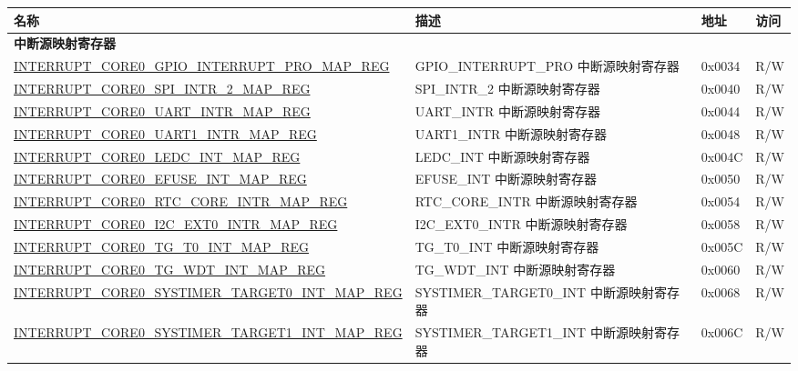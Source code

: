\begin{longtable}{ | p{10cm} | m{10cm} | m{1.3cm} | m{1.0cm} | }
\hline\rowcolor{lightgray}
名称 & 描述 & 地址 & 访问 \\ \hline
\endhead
\multicolumn{4}{|l|}{\textbf{中断源映射寄存器}} \\ \hline
\hyperref[regdesc:INTERRUPTCORE0GPIOINTERRUPTPROMAPREG]{INTERRUPT\_CORE0\_GPIO\_INTERRUPT\_PRO\_MAP\_REG} & GPIO\_INTERRUPT\_PRO 中断源映射寄存器 & 0x0034 & R/W \\ \hline
\hyperref[regdesc:INTERRUPTCORE0SPIINTR2MAPREG]{INTERRUPT\_CORE0\_SPI\_INTR\_2\_MAP\_REG} & SPI\_INTR\_2 中断源映射寄存器 & 0x0040 & R/W \\ \hline
\hyperref[regdesc:INTERRUPTCORE0UARTINTRMAPREG]{INTERRUPT\_CORE0\_UART\_INTR\_MAP\_REG} & UART\_INTR 中断源映射寄存器 & 0x0044 & R/W \\ \hline
\hyperref[regdesc:INTERRUPTCORE0UART1INTRMAPREG]{INTERRUPT\_CORE0\_UART1\_INTR\_MAP\_REG} & UART1\_INTR 中断源映射寄存器 & 0x0048 & R/W \\ \hline
\hyperref[regdesc:INTERRUPTCORE0LEDCINTMAPREG]{INTERRUPT\_CORE0\_LEDC\_INT\_MAP\_REG} & LEDC\_INT 中断源映射寄存器 & 0x004C & R/W \\ \hline
\hyperref[regdesc:INTERRUPTCORE0EFUSEINTMAPREG]{INTERRUPT\_CORE0\_EFUSE\_INT\_MAP\_REG} & EFUSE\_INT 中断源映射寄存器 & 0x0050 & R/W \\ \hline
\hyperref[regdesc:INTERRUPTCORE0RTCCOREINTRMAPREG]{INTERRUPT\_CORE0\_RTC\_CORE\_INTR\_MAP\_REG} & RTC\_CORE\_INTR 中断源映射寄存器 & 0x0054 & R/W \\ \hline
\hyperref[regdesc:INTERRUPTCORE0I2CEXT0INTRMAPREG]{INTERRUPT\_CORE0\_I2C\_EXT0\_INTR\_MAP\_REG} & I2C\_EXT0\_INTR 中断源映射寄存器 & 0x0058 & R/W \\ \hline
\hyperref[regdesc:INTERRUPTCORE0TGT0INTMAPREG]{INTERRUPT\_CORE0\_TG\_T0\_INT\_MAP\_REG} & TG\_T0\_INT 中断源映射寄存器 & 0x005C & R/W \\ \hline
\hyperref[regdesc:INTERRUPTCORE0TGWDTINTMAPREG]{INTERRUPT\_CORE0\_TG\_WDT\_INT\_MAP\_REG} & TG\_WDT\_INT 中断源映射寄存器 & 0x0060 & R/W \\ \hline
\hyperref[regdesc:INTERRUPTCORE0SYSTIMERTARGET0INTMAPREG]{INTERRUPT\_CORE0\_SYSTIMER\_TARGET0\_INT\_MAP\_REG} & SYSTIMER\_TARGET0\_INT 中断源映射寄存器 & 0x0068 & R/W \\ \hline
\hyperref[regdesc:INTERRUPTCORE0SYSTIMERTARGET1INTMAPREG]{INTERRUPT\_CORE0\_SYSTIMER\_TARGET1\_INT\_MAP\_REG} & SYSTIMER\_TARGET1\_INT 中断源映射寄存器 & 0x006C & R/W \\ \hline

\end{longtable}
